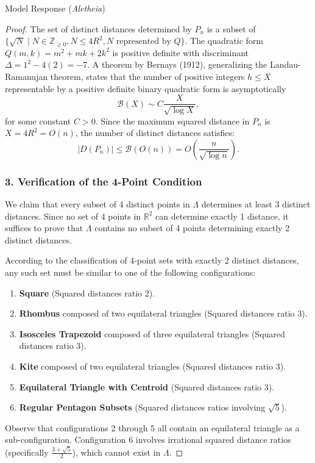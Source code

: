 \documentclass[11pt]{article}
\begin{document}
\begin{solution}{Model Response (\emph{Aletheia})}
\begin{proof}
The set of distinct distances determined by $P_n$ is a subset of $\{\sqrt{N} \mid N \in \mathbb{Z}_{\ge 0}, N \le 4R^2, N \text{ represented by } Q\}$.
The quadratic form $Q(m, k) = m^2 + mk + 2k^2$ is positive definite with discriminant $\Delta = 1^2 - 4(2) = -7$.
A theorem by Bernays (1912), generalizing the Landau-Ramanujan theorem, states that the number of positive integers $h \le X$ representable by a positive definite binary quadratic form is asymptotically
\[ \mathcal{B}(X) \sim C \frac{X}{\sqrt{\log X}}, \]
for some constant $C > 0$. Since the maximum squared distance in $P_n$ is $X = 4R^2 = O(n)$, the number of distinct distances satisfies:
\[ |D(P_n)| \le \mathcal{B}(O(n)) = O\left(\frac{n}{\sqrt{\log n}}\right). \]

\subsubsection*{3. Verification of the 4-Point Condition}

We claim that every subset of 4 distinct points in $\Lambda$ determines at least 3 distinct distances.
Since no set of 4 points in $\mathbb{R}^2$ can determine exactly 1 distance, it suffices to prove that $\Lambda$ contains no subset of 4 points determining exactly 2 distinct distances.

According to the classification of 4-point sets with exactly 2 distinct distances, any such set must be similar to one of the following configurations:
\begin{enumerate}
    \item \textbf{Square} (Squared distances ratio 2).
    \item \textbf{Rhombus} composed of two equilateral triangles (Squared distances ratio 3).
    \item \textbf{Isosceles Trapezoid} composed of three equilateral triangles (Squared distances ratio 3).
    \item \textbf{Kite} composed of two equilateral triangles (Squared distances ratio 3).
    \item \textbf{Equilateral Triangle with Centroid} (Squared distances ratio 3).
    \item \textbf{Regular Pentagon Subsets} (Squared distances ratios involving $\sqrt{5}$).
\end{enumerate}

Observe that configurations 2 through 5 all contain an equilateral triangle as a sub-configuration. Configuration 6 involves irrational squared distance ratios (specifically $\frac{3+\sqrt{5}}{2}$), which cannot exist in $\Lambda$.


\end{proof}
\end{solution}
\end{document}
